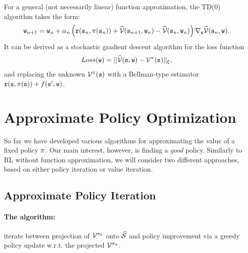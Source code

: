 For a general (not necessarily linear) function approximation, the TD(0) algorithm takes the form:
\begin{equation*}
    {\tt w}_{n+1} = {\tt w}_n + \alpha_n \left( {\tt r}({\tt s}_n,\pi({\tt s}_n)) + \widehat{\mathcal{V}}({\tt s}_{n+1},{\tt w}_n) - \widehat{\mathcal{V}}({\tt s}_{n},{\tt w}_n) \right) \nabla_{{\tt w}} \widehat{\mathcal{V}}({\tt s}_n,{\tt w}).
\end{equation*}
It can be derived as a stochastic gradient descent algorithm for the loss function
\begin{equation*}
    Loss({\tt w}) = ||\widehat{\mathcal{V}}({\tt s},{\tt w}) - \mathcal{V}^\pi({\tt s})||_\xi,
\end{equation*}
and replacing the unknown $\mathcal{V}^\pi({\tt s})$ with a Bellman-type estimator ${\tt r}({\tt s},\pi({\tt s}))+f({\tt s}',{\tt w})$.
%

\section{Approximate Policy Optimization}

So far we have developed various algorithms for approximating the value of a fixed policy $\pi$. Our main interest, however, is finding a \textit{good} policy. Similarly to RL without function approximation, we will consider two different approaches, based on either policy iteration or value iteration.

\subsection{Approximate Policy Iteration}

\paragraph{The algorithm:} iterate between projection of $\mathcal{V}^{\pi_k}$ onto $\widehat{\mathcal{S}}$ and policy improvement via a greedy policy update w.r.t. the projected $\mathcal{V}^{\pi_k}$.

